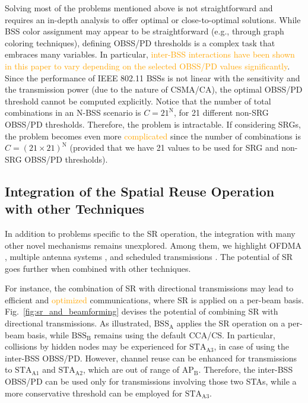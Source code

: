 \documentclass{ieeeaccess}
\begin{document}
Solving most of the problems mentioned above is not straightforward and requires an in-depth analysis to offer optimal or close-to-optimal solutions. While BSS color assignment may appear to be straightforward (e.g., through graph coloring techniques), defining OBSS/PD thresholds is a complex task that embraces many variables. In particular, \textcolor{orange}{inter-BSS interactions have been shown in this paper to vary depending on the selected OBSS/PD values significantly}. Since the performance of IEEE 802.11 BSSs is not linear with the sensitivity and the transmission power (due to the nature of CSMA/CA), the optimal OBSS/PD threshold cannot be computed explicitly. Notice that the number of total combinations in an N-BSS scenario is $C = 21^\text{N}$, for 21 different non-SRG OBSS/PD thresholds. Therefore, the problem is intractable. If considering SRGs, the problem becomes even more \textcolor{orange}{complicated} since the number of combinations is $C = (21\times21)^\text{N}$ (provided that we have 21 values to be used for SRG and non-SRG OBSS/PD thresholds).

\subsection{Integration of the Spatial Reuse Operation with other Techniques}

In addition to problems specific to the SR operation, the integration with many other novel mechanisms remains unexplored. Among them, we highlight OFDMA \cite{bankov2018ofdma, dovelos2018optimal}, multiple antenna systems \cite{liao2016mu}, and scheduled transmissions \cite{nurchis2019target}. The potential of SR goes further when combined with other techniques. 

For instance, the combination of SR with directional transmissions may lead to efficient and \textcolor{orange}{optimized} communications, where SR is applied on a per-beam basis. Fig.~\ref{fig:sr_and_beamforming} devises the potential of combining SR with directional transmissions. As illustrated, $\text{BSS}_\text{A}$ applies the SR operation on a per-beam basis, while $\text{BSS}_\text{B}$ remains using the default CCA/CS. In particular, collisions by hidden nodes may be experienced for $\text{STA}_\text{A3}$, in case of using the inter-BSS OBSS/PD. However, channel reuse can be enhanced for transmissions to $\text{STA}_\text{A1}$ and $\text{STA}_\text{A2}$, which are out of range of $\text{AP}_\text{B}$. Therefore, the inter-BSS OBSS/PD can be used only for transmissions involving those two STAs, while a more conservative threshold can be employed for $\text{STA}_\text{A3}$.
\end{document}

